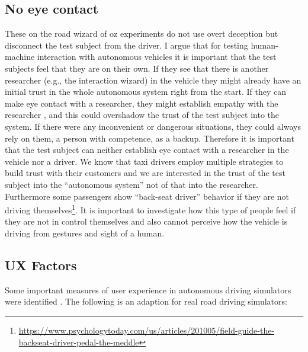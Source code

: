 \subsection{No eye contact}
These on the road wizard of oz experiments do not use overt deception but disconnect the test subject from the driver. I argue that for testing human-machine interaction with autonomous vehicles it is important that the test subjects feel that they are on their own. If they see that there is another researcher (e.g., the interaction wizard) in the vehicle they might already have an initial trust in the whole autonomous system right from the start. If they can make eye contact with a researcher, they might establish empathy with the researcher \cite{Haase1972NonverbalCommunication}, and this could overshadow the trust of the test subject into the system. If there were any inconvenient or dangerous situations, they could always rely on them, a person with competence, as a backup. Therefore it is important that the test subject can neither establish eye contact with a researcher in the vehicle nor a driver. We know that taxi drivers employ multiple strategies to build trust with their customers \cite{Gambetta2005Streetwise} and we are interested in the trust of the test subject into the “autonomous system” not of that into the researcher. Furthermore some passengers show “back-seat driver” behavior if they are not driving themselves\footnote{\url{https://www.psychologytoday.com/us/articles/201005/field-guide-the-backseat-driver-pedal-the-meddle}}. It is important to investigate how this type of people feel if they are not in control themselves and also cannot perceive how the vehicle is driving from gestures and sight of a human. 

\subsection{UX Factors}
\label{UXfactors}
Some important measures of user experience in autonomous driving simulators were identified \cite{Ive}. The following is an adaption for real road driving simulators: 

